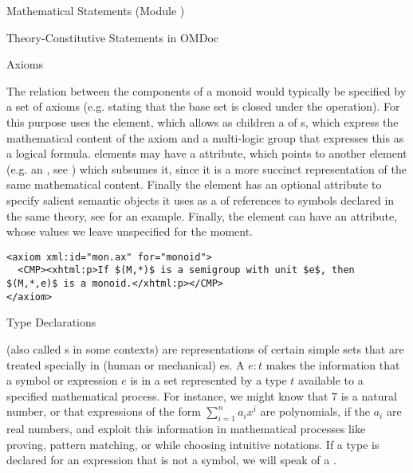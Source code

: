 \begin{tchapter}[id=statements,short=Mathematical Statements]{Mathematical Statements (Module {})}
\begin{tsection}[id=definitions]{Theory-Constitutive Statements in OMDoc}
\begin{tsubsection}[id=axioms]{Axioms}  
  
  The relation between the components of a monoid would typically be specified by a set of
  axioms (e.g. stating that the base set is closed under the operation). For this purpose
  {\omdoc} uses the {} element, which allows as children a
  {} of {}s, which express the mathematical
  content of the axiom and a multi-logic {} group
  that expresses this as a logical formula.  {} elements may have a
  {} attribute, which points to another {\omdoc} element
  (e.g. an {}, see {}) which subsumes it, since it is a more
  succinct representation of the same mathematical content. Finally the {}
  element has an optional {} attribute to specify salient semantic
  objects it uses as a {} of
  {} references to symbols declared in the same theory, see
  {} for an example. Finally, the {} element can
  have an {} attribute, whose values we leave
  unspecified for the moment.

\begin{lstlisting}[label=lst:axiom,mathescape,
  caption={An {\omdoc} {\element{axiom}}},index={axiom}]
<axiom xml:id="mon.ax" for="monoid">
  <CMP><xhtml:p>If $(M,*)$ is a semigroup with unit $e$, then $(M,*,e)$ is a monoid.</xhtml:p></CMP>
</axiom>
\end{lstlisting}
\end{tsubsection}

\begin{tsubsection}[id=type-axioms]{Type Declarations}

  {} (also called {s} in some contexts) are
  representations of certain simple sets that are treated specially in (human or
  mechanical) {es}. A {} $e\colon
  t$ makes the information that a symbol or expression $e$ is in a set represented by a
  type $t$ available to a specified mathematical process.  For instance, we might know
  that $7$ is a natural number, or that expressions of the form $\sum_{i=1}^n a_ix^{i}$
  are polynomials, if the $a_i$ are real numbers, and exploit this information in
  mathematical processes like proving, pattern matching, or while choosing intuitive
  notations. If a type is declared for an expression that is not a symbol, we will speak
  of a {}.
  

\end{tsubsection}
\end{tsection}
\end{tchapter}
